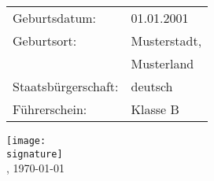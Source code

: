 \begin{sidebar}

  \displaysidebarpicture

  \displayjobdetails

  \begin{profile}
    \begin{tabular}{ll}
      Geburtsdatum:       & 01.01.2001   \\[3pt]
      Geburtsort:         & Musterstadt, \\[3pt]
                          & Musterland   \\[3pt]
      Staatsbürgerschaft: & deutsch      \\[3pt]
      Führerschein:       & Klasse B     \\[3pt]
    \end{tabular}
  \end{profile}
  \vspace{.5cm}
  \begin{contact}
  \end{contact}
  \vspace{.5cm}
  \begin{languages}
  \end{languages}

  \vspace{6.5cm}

  \texttt{[image: \\signature]}\\
  , \today
\end{sidebar}
